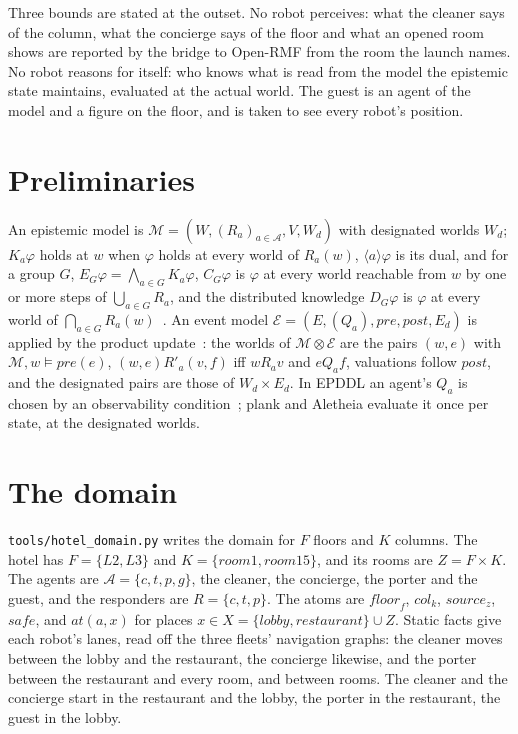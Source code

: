 \documentclass[11pt,a4paper]{article}
\theoremstyle{definition}
\newcommand{\Mod}{\mathcal{M}}
\newcommand{\Ev}{\mathcal{E}}
\newcommand{\prd}{\otimes}
\newcommand{\code}[1]{\texttt{\small #1}}
\newcommand{\pre}{\mathit{pre}}
\newcommand{\post}{\mathit{post}}
\newcommand{\safe}{\mathit{safe}}
\newcommand{\src}[1]{\mathit{source}_{#1}}
\newcommand{\fl}[1]{\mathit{floor}_{#1}}
\newcommand{\cl}[1]{\mathit{col}_{#1}}
\newcommand{\at}{\mathit{at}}
\begin{document}
Three bounds are stated at the outset. No robot perceives: what the cleaner
says of the column, what the concierge says of the floor and what an opened
room shows are reported by the bridge to Open-RMF from the room the launch
names. No robot reasons for itself: who knows what is read from the model the
epistemic state maintains, evaluated at the actual world. The guest is an
agent of the model and a figure on the floor, and is taken to see every
robot's position.

\section{Preliminaries}
\label{sec:prelim}

An epistemic model is $\Mod = (W, (R_a)_{a \in \mathcal{A}}, V, W_d)$ with
designated worlds $W_d$; $K_a\varphi$ holds at $w$ when $\varphi$ holds at every
world of $R_a(w)$, $\langle a\rangle\varphi$ is its dual, and for a group $G$,
$E_G\varphi = \bigwedge_{a \in G} K_a\varphi$, $C_G\varphi$ is $\varphi$ at
every world reachable from $w$ by one or more steps of $\bigcup_{a \in G} R_a$,
and the distributed knowledge $D_G\varphi$ is $\varphi$ at every world of
$\bigcap_{a \in G} R_a(w)$~\cite{fhmv1995}. An event model
$\Ev = (E, (Q_a), \pre, \post, E_d)$ is applied by the product
update~\cite{bms1998, vanditmarsch2007}: the worlds of $\Mod \prd \Ev$ are the
pairs $(w, e)$ with $\Mod, w \models \pre(e)$, $(w,e) \mathrel{R'_a} (v,f)$ iff
$w \mathrel{R_a} v$ and $e \mathrel{Q_a} f$, valuations follow $\post$, and the
designated pairs are those of $W_d \times E_d$. In EPDDL an agent's $Q_a$ is
chosen by an observability condition~\cite{ba2011}; plank and Aletheia evaluate
it once per state, at the designated worlds.

\section{The domain}
\label{sec:domain}

\code{tools/hotel\_domain.py} writes the domain for $F$ floors and $K$ columns.
The hotel has $F = \{L2, L3\}$ and $K = \{\mathit{room1}, \mathit{room15}\}$, and
its rooms are $Z = F \times K$. The agents are $\mathcal{A} = \{c, t, p, g\}$,
the cleaner, the concierge, the porter and the guest, and the responders are
$R = \{c, t, p\}$. The atoms are $\fl{f}$, $\cl{k}$, $\src{z}$, $\safe$, and
$\at(a, x)$ for places $x \in X = \{\mathit{lobby}, \mathit{restaurant}\} \cup Z$.
Static facts give each robot's lanes, read off the three fleets' navigation
graphs: the cleaner moves between the lobby and the restaurant, the concierge
likewise, and the porter between the restaurant and every room, and between
rooms. The cleaner and the concierge start in the restaurant and the lobby, the
porter in the restaurant, the guest in the lobby.
\end{document}
